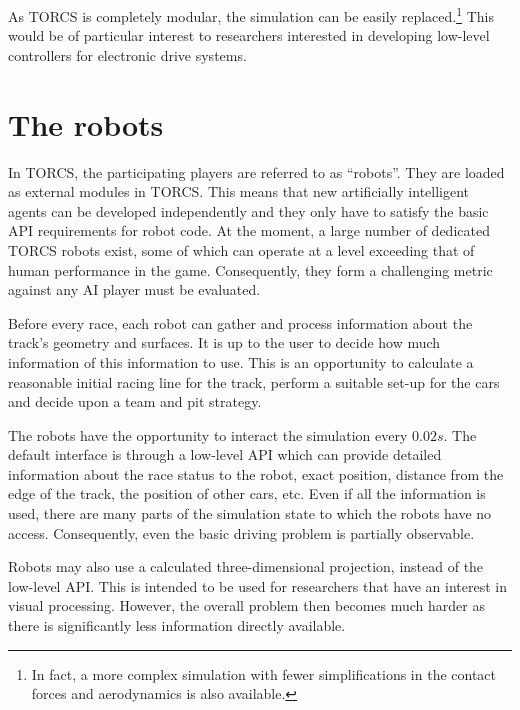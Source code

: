 \documentclass[a4paper]{article}
\begin{document}
As TORCS is completely modular, the simulation can be easily replaced.\footnote{In fact, a more complex simulation with fewer simplifications in the contact forces and aerodynamics is also available.}
This would be of particular interest to researchers interested in developing low-level controllers for electronic drive systems. 

\section{The robots}

In TORCS, the participating players are referred to as ``robots''. They are loaded as external modules in TORCS. This means that new artificially intelligent agents can be developed independently and they only have to satisfy the basic API requirements for robot code. At the moment, a large number of dedicated TORCS robots exist, some of which can operate at a level exceeding that of human performance in the game. Consequently, they form a challenging metric against any AI player must be evaluated.

Before every race, each robot can gather and process information about the track's geometry and surfaces. It is up to the user to decide how much information of this information to use. This is an opportunity to calculate a reasonable initial racing line for the track, perform a suitable set-up for the cars and decide upon a team and pit strategy.

The robots have the opportunity to interact the simulation every $0.02s$. The default interface is through a low-level API which can provide detailed information about the race status to the robot, exact position, distance from the edge of the track, the position of other cars, etc. Even if all the information is used, there are many parts of the simulation state to which the robots have no access. Consequently, even the basic driving problem is partially observable. 

Robots may also use a calculated three-dimensional projection, instead of the low-level API. This is intended to be used for researchers that have an interest in visual processing. However, the overall problem then becomes much harder as there is significantly less information directly available. 

\end{document}
